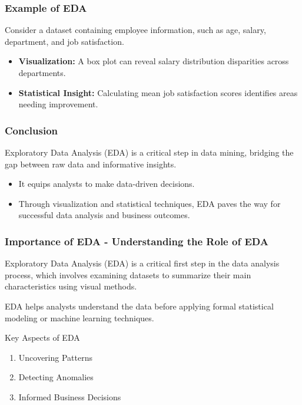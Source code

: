 \documentclass{beamer}
\begin{document}
\begin{frame}[fragile]
    \frametitle{Example of EDA}
    Consider a dataset containing employee information, such as age, salary, department, and job satisfaction.
    \begin{itemize}
        \item \textbf{Visualization:} A box plot can reveal salary distribution disparities across departments.
        \item \textbf{Statistical Insight:} Calculating mean job satisfaction scores identifies areas needing improvement.
    \end{itemize}
\end{frame}

\begin{frame}[fragile]
    \frametitle{Conclusion}
    Exploratory Data Analysis (EDA) is a critical step in data mining, bridging the gap between raw data and informative insights.
    \begin{itemize}
        \item It equips analysts to make data-driven decisions.
        \item Through visualization and statistical techniques, EDA paves the way for successful data analysis and business outcomes.
    \end{itemize}
\end{frame}

\begin{frame}[fragile]
    \frametitle{Importance of EDA - Understanding the Role of EDA}
    Exploratory Data Analysis (EDA) is a critical first step in the data analysis process, which involves examining datasets to summarize their main characteristics using visual methods.
    
    EDA helps analysts understand the data before applying formal statistical modeling or machine learning techniques.

    \begin{block}{Key Aspects of EDA}
        \begin{enumerate}
            \item Uncovering Patterns
            \item Detecting Anomalies
            \item Informed Business Decisions
        \end{enumerate}
    \end{block}
\end{frame}
\end{document}
